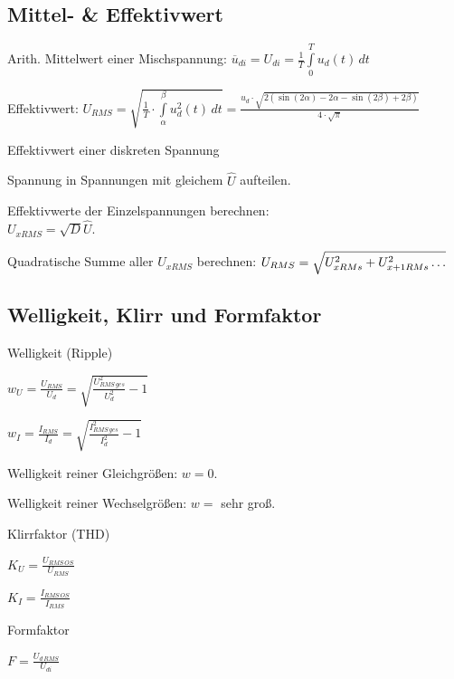 \documentclass[german]{latex4ei/latex4ei_sheet}
\begin{document}
	\subsection{Mittel- \& Effektivwert}
	\begin{sectionbox}
		\begin{symbolbox}
			\item Arith. Mittelwert einer Mischspannung: $\overline{u}_{di} = U_{di} = \frac{1}{T}\int\limits_0^T u_d(t)\,dt$
			\item Effektivwert: $U_{RMS} = \sqrt{\frac{1}{T}\cdot \int\limits_{\alpha}^\beta u^2_d(t)\,dt}= \frac{u_d \cdot \sqrt{2(\sin(2\alpha)-2\alpha - \sin(2\beta)+2\beta)}}{4\cdot\sqrt{\pi}}$
		\end{symbolbox}
		\begin{cookbox}{Effektivwert einer diskreten Spannung}
			\item Spannung in Spannungen mit gleichem $\hat{U}$ aufteilen.
			\item Effektivwerte der Einzelspannungen berechnen:\\ $U_{xRMS} = \sqrt{D} \hat{U}$.
			\item Quadratische Summe aller $U_{xRMS}$ berechnen: $\\ U_{RMS} = \sqrt{U_{xRMs}^2+U_{x+1RMs}^2\dots}$
		\end{cookbox}
	\subsection{Welligkeit, Klirr und Formfaktor}
		\begin{symbolbox}{Welligkeit (Ripple)}
			\item $w_U = \frac{U_{RMS}}{U_d} = \sqrt{\frac{U_{RMS\,ges}^2}{U_d^2}-1}$
			\item $w_I = \frac{I_{RMS}}{I_d} = \sqrt{\frac{I_{RMS\,ges}^2}{I_d^2}-1}$
			\item Welligkeit reiner Gleichgrößen: $w = 0$.
			\item Welligkeit reiner Wechselgrößen: $w =$ sehr groß.
		\end{symbolbox}
		\begin{bluebox}{Klirrfaktor (THD)}
			\item $K_U =   \frac{U_{RMS\, OS}}{U_{RMS}}$
			\item $K_I =   \frac{I_{RMS\, OS}}{I_{RMS}}$
		\end{bluebox}

		\begin{symbolbox}{Formfaktor}
			\item $F = \frac{U_{d\,RMS}}{U_{di}}$
		\end{symbolbox}

\end{sectionbox}
\end{document}
